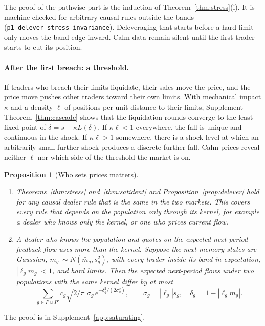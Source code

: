 \documentclass[12pt]{article}
\newtheorem{proposition}[theorem]{Proposition}
\theoremstyle{definition}
\theoremstyle{remark}
\begin{document}
The proof of the pathwise part is the induction of Theorem~\ref{thm:stress}(i). It is machine-checked for arbitrary causal rules outside the bands (\texttt{p1\_delever\_stress\_invariance}). Deleveraging that starts before a hard limit only moves the band edge inward. Calm data remain silent until the first trader starts to cut its position.

\paragraph{After the first breach: a threshold.} If traders who breach their limits liquidate, their sales move the price, and the price move pushes other traders toward their own limits. With mechanical impact $\kappa$ and a density $\ell$ of positions per unit distance to their limits, Supplement Theorem~\ref{thm:cascade} shows that the liquidation rounds converge to the least fixed point of $\delta=s+\kappa L(\delta)$. If $\kappa\ell<1$ everywhere, the fall is unique and continuous in the shock. If $\kappa\ell>1$ somewhere, there is a shock level at which an arbitrarily small further shock produces a discrete further fall. Calm prices reveal neither $\ell$ nor which side of the threshold the market is on.

\begin{proposition}[Who sets prices matters]\label{prop:dealers}
\begin{enumerate}[label=(\roman*),itemsep=1pt]
\item Theorems~\ref{thm:stress} and~\ref{thm:satident} and Proposition~\ref{prop:delever} hold for any causal dealer rule that is the same in the two markets. This covers every rule that depends on the population only through its kernel, for example a dealer who knows only the kernel, or one who prices current flow.
\item A dealer who knows the population and quotes on the expected next-period feedback flow uses more than the kernel. Suppose the next memory states are Gaussian, $m^+_g\sim N(\bar m_g,s_g^2)$, with every trader inside its band in expectation, $|\ell_g\bar m_g|<1$, and hard limits. Then the expected next-period flows under two populations with the same kernel differ by at most
\[
 \sum_{g\in P\cup P'}c_g\sqrt{2/\pi}\;\sigma_g\,e^{-\delta_g^2/(2\sigma_g^2)},\qquad \sigma_g=|\ell_g|s_g,\quad\delta_g=1-|\ell_g\bar m_g|.
\]
\end{enumerate}
\end{proposition}

The proof is in Supplement~\ref{app:saturating}.
\end{document}

